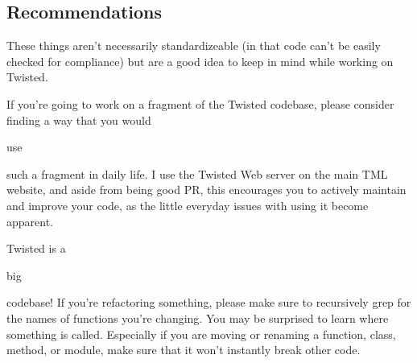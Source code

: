 \subsection{Recommendations}


These things aren't necessarily standardizeable (in that     code can't be easily checked for compliance) but are a good     idea to keep in mind while working on Twisted.

If you're going to work on a fragment of the Twisted     codebase, please consider finding a way that you would \begin{em}use\end{em}     such a fragment in daily life. I use the Twisted Web server on     the main TML website, and aside from being good PR, this     encourages you to actively maintain and improve your code, as     the little everyday issues with using it become apparent.

Twisted is a \begin{em}big\end{em} codebase! If you're     refactoring something, please make sure to recursively grep for     the names of functions you're changing. You may be surprised to     learn where something is called. Especially if you are moving     or renaming a function, class, method, or module, make sure     that it won't instantly break other code.